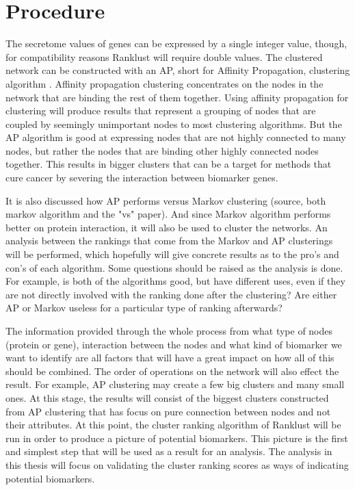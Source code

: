 \part{Procedure}
The secretome values of genes can be expressed by a single integer value,
though, for compatibility reasons Ranklust will require double values. The
clustered network can be constructed with an AP, short for Affinity Propagation,
clustering algorithm \cite{affinity-propagation}. Affinity propagation
clustering concentrates on the nodes in the network that are binding the rest of
them together. Using affinity propagation for clustering will produce results
that represent a grouping of nodes that are coupled by seemingly unimportant
nodes to most clustering algorithms. But the AP algorithm is good at expressing
nodes that are not highly connected to many nodes, but rather the nodes that are
binding other highly connected nodes together. This results in bigger clusters
that can be a target for methods that cure cancer by severing the interaction
between biomarker genes.

It is also discussed how AP performs versus Markov clustering (source, both
markov algorithm and the "vs" paper). And since Markov algorithm performs better
on protein interaction, it will also be used to cluster the networks. An
analysis between the rankings that come from the Markov and AP clusterings will
be performed, which hopefully will give concrete results as to the pro's and
con's of each algorithm. Some questions should be raised as the analysis is
done. For example, is both of the algorithms good, but have different uses, even
if they are not directly involved with the ranking done after the clustering?
Are either AP or Markov useless for a particular type of ranking afterwards?

The information provided through the whole process from what type of nodes
(protein or gene), interaction between the nodes and what kind of biomarker we
want to identify are all factors that will have a great impact on how all of
this should be combined. The order of operations on the network will also effect
the result. For example, AP clustering may create a few big clusters and many
small ones. At this stage, the results will consist of the biggest clusters
constructed from AP clustering that has focus on pure connection between nodes
and not their attributes. At this point, the cluster ranking algorithm of
Ranklust will be run in order to produce a picture of potential biomarkers. This
picture is the first and simplest step that will be used as a result for an
analysis. The analysis in this thesis will focus on validating the cluster
ranking scores as ways of indicating potential biomarkers. 

